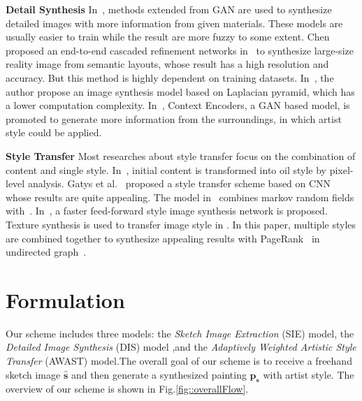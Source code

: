 \documentclass[10pt,twocolumn,letterpaper]{article}
\begin{document}
\textbf{Detail Synthesis}
In~\cite{sangkloy2016scribbler, isola2016image, odena2016conditional}, methods extended from GAN are used to synthesize detailed images with more information from given materials. These models are usually easier to train while the result are more fuzzy to some extent. Chen proposed an end-to-end cascaded refinement networks in~\cite{chen2017photographic} to synthesize large-size reality image from semantic layouts, whose result has a high resolution and accuracy. But this method is highly dependent on training datasets.
In~\cite{ho2016laplacian}, the author propose an image synthesis model based on Laplacian pyramid, which has a lower computation complexity.
In~\cite{pathak2016context}, Context Encoders,  a GAN based model, is promoted to generate more information from the surroundings, in which artist style could be applied.

\textbf{Style Transfer}
Most researches about style transfer focus on the combination of content and single style. In~\cite{huang2015synthesis}, initial content is transformed into oil style by pixel-level analysis. Gatys et al.~\cite{gatys2015neural} proposed a style transfer scheme based on CNN whose results are quite appealing. The model in~\cite{li2016combining} combines markov random fields with~\cite{gatys2015neural}.
In~\cite{ulyanov2016texture}, a faster feed-forward style image synthesis network is proposed.
Texture synthesis is used to transfer image style in \cite{elad2017style}. In this paper, multiple styles are combined together to synthesize appealing results with PageRank~\cite{page1999pagerank} in undirected graph~\cite{mihalcea2004textrank}.

%

\section{Formulation}
Our scheme includes three models: the \textit{Sketch Image Extraction} (SIE) model, the \textit{Detailed Image Synthesis} (DIS) model ,and the \textit{Adaptively Weighted Artistic Style Transfer} (AWAST) model.The overall goal of our scheme is to receive a freehand sketch image $\bm{\hat{s}}$ and then generate a synthesized painting $\bm{p_s}$ with artist style. The overview of our scheme is shown in Fig.\ref{fig::overallFlow}.
\end{document}

